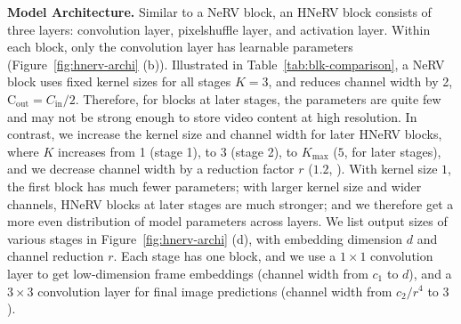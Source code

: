 \documentclass[10pt,twocolumn,letterpaper]{article}
\newcommand{\VS}{\textit{vs}.\xspace}
\begin{document}
\noindent\textbf{Model Architecture.} 
Similar to a NeRV block, an HNeRV block consists of three layers: convolution layer, pixelshuffle layer, and activation layer.
Within each block, only the convolution layer has learnable parameters (Figure~\ref{fig:hnerv-archi} (b)).
Illustrated in Table~\ref{tab:blk-comparison}, a NeRV block uses fixed kernel sizes for all stages $K=3$, and reduces channel width by 2, C$_\text{out}=C_\text{in}/2$.
Therefore, for blocks at later stages, the parameters are quite few and may not be strong enough to store video content at high resolution.
In contrast, we increase the kernel size and channel width for later HNeRV blocks, where $K$ increases from 1 (stage 1), to 3 (stage 2), to $K_\text{max}$ ($5$, \etc for later stages), and we decrease channel width by a reduction factor $r$ ($1.2$, \etc).
With kernel size $1$, the first block has much fewer parameters; with larger kernel size and wider channels, HNeRV blocks at later stages are much stronger; and we therefore get a more even distribution of model parameters across layers.
We list output sizes of various stages in Figure~\ref{fig:hnerv-archi} (d), with embedding dimension $d$ and channel reduction $r$.
Each stage has one block, and we use a $1\times1$ convolution layer to get low-dimension frame embeddings (channel width from $c_1$ to $d$), and a $3\times3$ convolution layer for final image predictions (channel width from $c_2/r^4$ to $3$).

\begin{table}[t!]
    \vspace{-0.7em}
    \centering
    \caption{\textbf{HNeRV block \VS NeRV block}. 
    $k$ is kernel size for each stage, $C_\text{out}$ and $C_\text{in}$ are output/input channels for each block.
    We decrease parameters via a small $k = 1$ for first block, and increase parameters for later layers with a larger $k$ and wider channels.}
    \label{tab:blk-comparison}    
    \vspace{-0.5em}
    \vspace{-0.5em}
\end{table}
\end{document}
